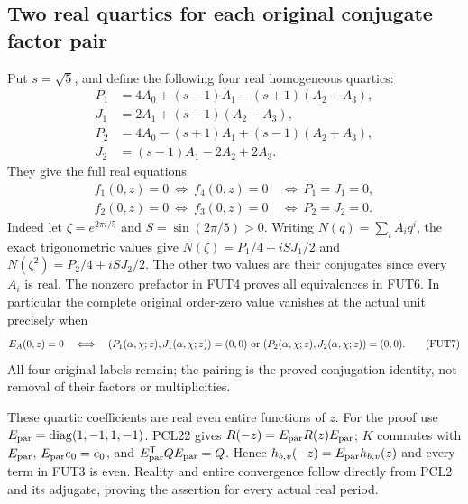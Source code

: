 \documentclass[11pt]{article}
\begin{document}
\subsection{Two real quartics for each original conjugate factor pair}
Put $s=\sqrt5$, and define the following four real homogeneous quartics:
\[
 \begin{split}
 P_1&=4A_0+(s-1)A_1-(s+1)(A_2+A_3),\\
 J_1&=2A_1+(s-1)(A_2-A_3),\\
 P_2&=4A_0-(s+1)A_1+(s-1)(A_2+A_3),\\
 J_2&=(s-1)A_1-2A_2+2A_3.
 \end{split}\tag{FUT5}
\]
They give the full real equations
\[
 \begin{split}
 f_1(0,z)=0\ \Longleftrightarrow\ f_4(0,z)=0
       &\ \Longleftrightarrow\ P_1=J_1=0,\\
 f_2(0,z)=0\ \Longleftrightarrow\ f_3(0,z)=0
       &\ \Longleftrightarrow\ P_2=J_2=0.
 \end{split}\tag{FUT6}
\]
Indeed let $\zeta=e^{2\pi i/5}$ and $S=\sin(2\pi/5)>0$.
Writing $N(q)=\sum_iA_iq^i$, the exact trigonometric values give
$N(\zeta)=P_1/4+iSJ_1/2$ and
$N(\zeta^2)=P_2/4+iSJ_2/2$.
The other two values are their conjugates since every $A_i$ is real.
The nonzero prefactor in FUT4 proves all equivalences in FUT6.
In particular the complete original order-zero value vanishes at the
actual unit precisely when
\[
 E_A(0,z)=0
 \quad\Longleftrightarrow\quad
 (P_1(\alpha,\chi;z),J_1(\alpha,\chi;z))=(0,0)
 \ \hbox{or}\ 
 (P_2(\alpha,\chi;z),J_2(\alpha,\chi;z))=(0,0).
 \tag{FUT7}
\]
All four original labels remain; the pairing is the proved conjugation
identity, not removal of their factors or multiplicities.

These quartic coefficients are real even entire functions of $z$.
For the proof use $E_{\rm par}=\operatorname{diag}(1,-1,1,-1)$.
PCL22 gives $R(-z)=E_{\rm par}R(z)E_{\rm par}$;
$K$ commutes with $E_{\rm par}$, $E_{\rm par}e_0=e_0$, and
$E_{\rm par}^{\mathsf T}QE_{\rm par}=Q$.
Hence $h_{b,v}(-z)=E_{\rm par}h_{b,v}(z)$ and every term in FUT3
is even. Reality and entire convergence follow directly from PCL2
and its adjugate, proving the assertion for every actual real period.
\end{document}
